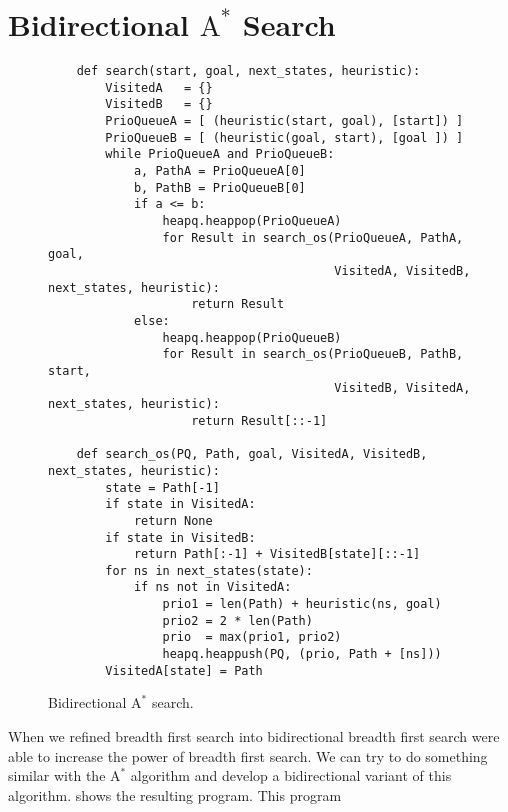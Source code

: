 \section{Bidirectional $\mathrm{A}^*$ Search}
\begin{figure}[!ht]
\centering
\begin{verbatim}
    def search(start, goal, next_states, heuristic):
        VisitedA   = {}
        VisitedB   = {}
        PrioQueueA = [ (heuristic(start, goal), [start]) ]
        PrioQueueB = [ (heuristic(goal, start), [goal ]) ]
        while PrioQueueA and PrioQueueB:
            a, PathA = PrioQueueA[0]
            b, PathB = PrioQueueB[0]
            if a <= b:
                heapq.heappop(PrioQueueA)
                for Result in search_os(PrioQueueA, PathA, goal,
                                        VisitedA, VisitedB, next_states, heuristic):
                    return Result
            else:
                heapq.heappop(PrioQueueB)
                for Result in search_os(PrioQueueB, PathB, start,
                                        VisitedB, VisitedA, next_states, heuristic):
                    return Result[::-1]
    
    def search_os(PQ, Path, goal, VisitedA, VisitedB, next_states, heuristic):
        state = Path[-1]
        if state in VisitedA:
            return None
        if state in VisitedB:
            return Path[:-1] + VisitedB[state][::-1]
        for ns in next_states(state):           
            if ns not in VisitedA:
                prio1 = len(Path) + heuristic(ns, goal)
                prio2 = 2 * len(Path)
                prio  = max(prio1, prio2)
                heapq.heappush(PQ, (prio, Path + [ns]))
        VisitedA[state] = Path
\end{verbatim}
\vspace*{-0.3cm}
\caption{Bidirectional $\mathrm{A}^*$ search.}
\label{fig:Bidirectional-A-Star-Search.ipynb}
\end{figure}
\noindent
When we refined breadth first search into bidirectional breadth first search were able to increase the power of
breadth first search.  We can try to do something similar with the $\mathrm{A}^*$ algorithm and develop a
bidirectional variant of this algorithm.   shows the resulting program.  This program
